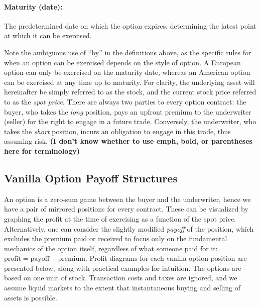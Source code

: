 \documentclass[english,12pt,a4paper,pdftex,sci,utf8]{aaltothesis}
\begin{document}
\paragraph{Maturity (date):}The predetermined date on which the option expires, determining the latest point at which it can be exercised.
\bigskip

Note the ambiguous use of ``by'' in the definitions above, as the specific rules for when an option can be exercised depends on the style of option. A European option can only be exercised on the maturity date, whereas an American option can be exercised at any time up to maturity. For clarity, the underlying asset will hereinafter be simply referred to as the stock, and the current stock price referred to as the \emph{spot price}. There are always two parties to every option contract: the buyer, who takes the \emph{long} position, pays an upfront premium to the underwriter (seller) for the right to engage in a future trade. Conversely, the underwriter, who takes the \emph{short} position, incurs an obligation to engage in this trade, thus assuming risk. \textbf{(I don't know whether to use emph, bold, or parentheses here for terminology)}

\subsection{Vanilla Option Payoff Structures}\label{subsec:payoffs}

An option is a zero-sum game between the buyer and the underwriter, hence we have a pair of mirrored positions for every contract. These can be visualized by graphing the profit at the time of exercising as a function of the spot price. Alternatively, one can consider the slightly modified \emph{payoff} of the position, which excludes the premium paid or received to focus only on the fundamental mechanics of the option itself, regardless of what someone paid for it: $\text{profit} = \text{payoff} - \text{premium}$. Profit diagrams for each vanilla option position are presented below, along with practical examples for intuition. The options are based on one unit of stock. Transaction costs and taxes are ignored, and we assume liquid markets to the extent that instantaneous buying and selling of assets is possible.
\end{document}
